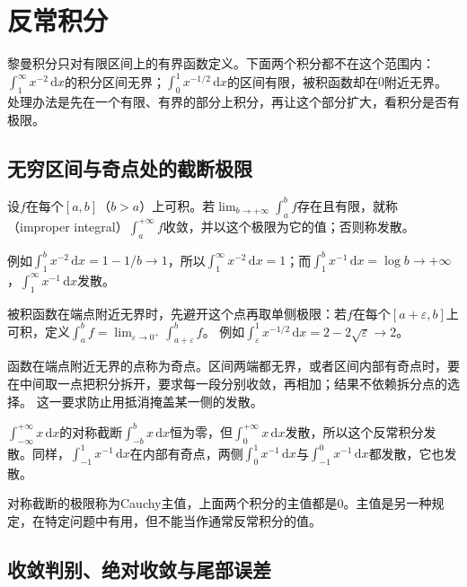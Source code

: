 \section{反常积分}
\label{sec:ru-improper-integrals}

黎曼积分只对有限区间上的有界函数定义。下面两个积分都不在这个范围内：$\int_1^\infty x^{-2}\,\mathrm dx$的积分区间无界；$\int_0^1x^{-1/2}\,\mathrm dx$的区间有限，被积函数却在$0$附近无界。
处理办法是先在一个有限、有界的部分上积分，再让这个部分扩大，看积分是否有极限。

\subsection{无穷区间与奇点处的截断极限}
\label{sec:ru-improper-definition}

设$f$在每个$[a,b]$（$b>a$）上可积。若$\lim_{b\to+\infty}\int_a^bf$存在且有限，就称（improper integral）$\int_a^{+\infty}f$收敛，并以这个极限为它的值；否则称发散。

例如$\int_1^bx^{-2}\,\mathrm dx=1-1/b\to1$，所以$\int_1^\infty x^{-2}\,\mathrm dx=1$；而$\int_1^bx^{-1}\,\mathrm dx=\log b\to+\infty$，$\int_1^\infty x^{-1}\,\mathrm dx$发散。

被积函数在端点附近无界时，先避开这个点再取单侧极限：若$f$在每个$[a+\varepsilon,b]$上可积，定义$\int_a^bf=\lim_{\varepsilon\to0^+}\int_{a+\varepsilon}^bf$。
例如$\int_\varepsilon^1x^{-1/2}\,\mathrm dx=2-2\sqrt\varepsilon\to2$。

函数在端点附近无界的点称为奇点。区间两端都无界，或者区间内部有奇点时，要在中间取一点把积分拆开，要求每一段分别收敛，再相加；结果不依赖拆分点的选择。
这一要求防止用抵消掩盖某一侧的发散。

\begin{example}[对称截断掩盖发散]
\label{ex:ru-symmetric-truncation}
$\int_{-\infty}^{+\infty}x\,\mathrm dx$的对称截断$\int_{-b}^bx\,\mathrm dx$恒为零，但$\int_0^{+\infty}x\,\mathrm dx$发散，所以这个反常积分发散。同样，$\int_{-1}^1x^{-1}\,\mathrm dx$在内部有奇点，两侧$\int_0^1x^{-1}\,\mathrm dx$与$\int_{-1}^0x^{-1}\,\mathrm dx$都发散，它也发散。
\end{example}

对称截断的极限称为Cauchy主值，上面两个积分的主值都是$0$。主值是另一种规定，在特定问题中有用，但不能当作通常反常积分的值。

\subsection{收敛判别、绝对收敛与尾部误差}
\label{sec:ru-improper-tests}

